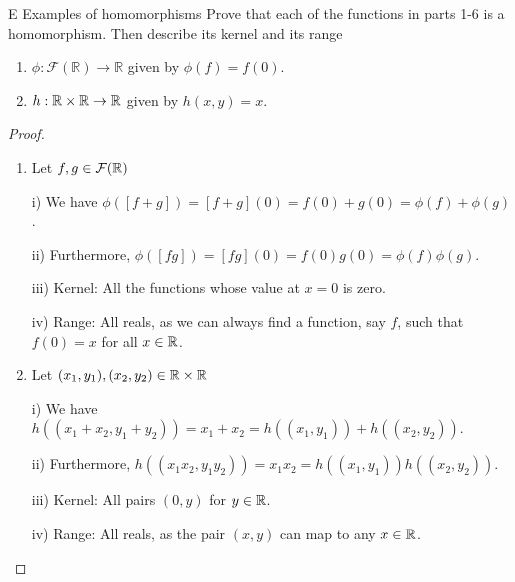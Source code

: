 \begin{exercise}{E Examples of homomorphisms}
  Prove that each of the functions in parts 1-6 is a homomorphism. Then describe its kernel and its range
  \begin{enumerate}
      \item $\phi:\mathcal{F}(\mathbb{R})\rightarrow\mathbb{R}$ given by $\phi(f)=f(0)$.
      \item $h:\mathbb{R}\times\mathbb{R}\rightarrow\mathbb{R}$ given by $h(x,y)=x$.
  \end{enumerate}
\end{exercise}
\begin{proof}
 \begin{enumerate}
     \item Let $f,g\in\mathcal{F}(\mathbb{R})$

     i) We have $\phi([f+g])=[f+g](0)=f(0)+g(0)=\phi(f)+\phi(g)$.

     ii) Furthermore, $\phi([fg])=[fg](0)=f(0)g(0)=\phi(f)\phi(g)$.

     iii) Kernel: All the functions whose value at $x=0$ is zero.

     iv) Range: All reals, as we can always find a function, say $f$, such that $f(0)=x$ for all $x\in\mathbb{R}$.
     \item Let $(x_{1},y_{1}),(x_{2},y_{2})\in\mathbb{R}\times\mathbb{R}$

     i) We have $h((x_{1}+x_{2},y_{1}+y_{2}))= x_{1}+x_{2}= h((x_{1},y_{1}))+h((x_{2},y_{2}))$.

     ii) Furthermore, $h((x_{1}x_{2},y_{1}y_{2}))= x_{1}x_{2}= h((x_{1},y_{1}))h((x_{2},y_{2}))$.

     iii) Kernel: All pairs $(0,y)$ for $y\in\mathbb{R}$.

     iv) Range: All reals, as the pair $(x,y)$ can map to any $x\in\mathbb{R}$.
 \end{enumerate}
\end{proof}


